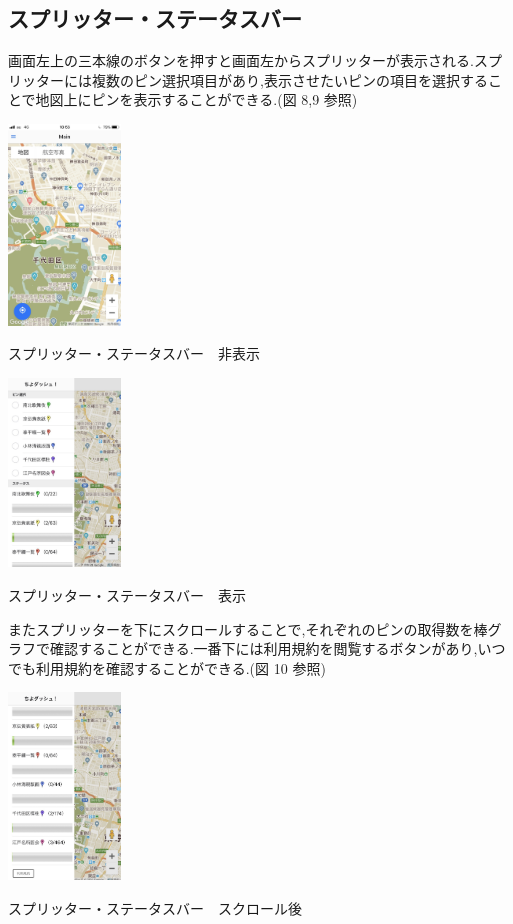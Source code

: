\documentclass[a4paper, twoside]{jarticle}
\makeatletter
\newenvironment{figurehere}
  {\def\@captype{figure}}
  {}
\makeatother
\begin{document}
\begin{multicols}{2}
\subsection{スプリッター・ステータスバー}
画面左上の三本線のボタンを押すと画面左からスプリッターが表示される.スプリッターには複数のピン選択項目があり,表示させたいピンの項目を選択することで地図上にピンを表示することができる.(図 8,9 参照)
\begin{figurehere}
\begin{center}
\includegraphics[bb=30 50 550 1300,width=3cm]{./image09-0.jpg}%
\end{center}
\caption{スプリッター・ステータスバー　非表示}\label{fig:8}
\begin{center}
\includegraphics[bb=30 50 550 1300,width=3cm]{./image09.jpg}%
\end{center}
\caption{スプリッター・ステータスバー　表示}\label{fig:9}
\end{figurehere}

またスプリッターを下にスクロールすることで,それぞれのピンの取得数を棒グラフで確認することができる.一番下には利用規約を閲覧するボタンがあり,いつでも利用規約を確認することができる.(図 10 参照)
\begin{figurehere}
\begin{center}
\includegraphics[bb=30 50 550 1300,width=3cm]{./image10.jpg}%
\end{center}
\caption{スプリッター・ステータスバー　スクロール後}\label{fig:10}
\end{figurehere}



\end{multicols}
\end{document}
